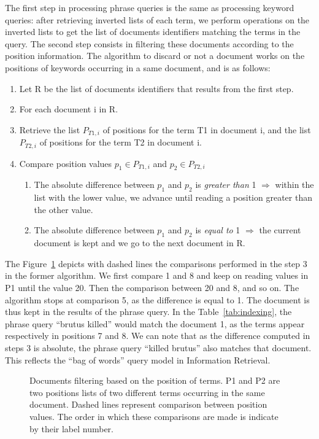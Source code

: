 The first step in processing phrase queries is the same as processing
keyword queries: after retrieving inverted lists of each term, we perform
operations on the inverted lists to get the list of documents identifiers
matching the terms in the query. The second step consists in filtering these
documents according to the position information. The algorithm to discard or
not a document works on the positions of keywords occurring in a same document,
and is as follows:
\begin{enumerate}
  \item[] Let R be the list of documents identifiers that results from the
  first step.
  \item For each document i in R.
  \item Retrieve the list $P_{T1,i}$ of positions for the term T1 in document i,
  and the list $P_{T2,i}$ of positions for the term T2 in document i.
  \item Compare position values $p_1 \in P_{T1,i}$ and $p_2 \in P_{T2,i}$
  \begin{enumerate}
    \item The absolute difference between $p_1$ and $p_2$ is \emph{greater than}
    1 $\Rightarrow$ within the list with the lower value, we advance until
    reading a position greater than the other value.
    \item The absolute difference between $p_1$ and $p_2$ is \emph{equal to} 1
    $\Rightarrow$ the current document is kept and we go to the next document
    in R.
  \end{enumerate}
\end{enumerate}
The Figure~\ref{fig:PQquery} depicts with dashed lines the comparisons performed
in the step 3 in the former algorithm. We first compare 1 and 8 and keep on
reading values in P1 until the value 20. Then the comparison between 20 and 8,
and so on. The algorithm stops at comparison 5, as the difference is equal to
1. The document is thus kept in the results of the phrase query. In the
Table~\ref{tab:indexing}, the phrase query ``brutus killed'' would match the
document 1, as the terms appear respectively in positions 7 and 8. We can note
that as the difference computed in steps 3 is absolute, the phrase query
``killed brutus'' also matches that document. This reflects the ``bag of
words'' query model in Information Retrieval.

\begin{figure}
\centering
{}%
\caption{Documents filtering based on the position of terms. P1 and P2 are two
positions lists of two different terms occurring in the same document. Dashed
lines represent comparison between position values. The order in which these
comparisons are made is indicate by their label number.}
\label{fig:PQquery}
\end{figure}
